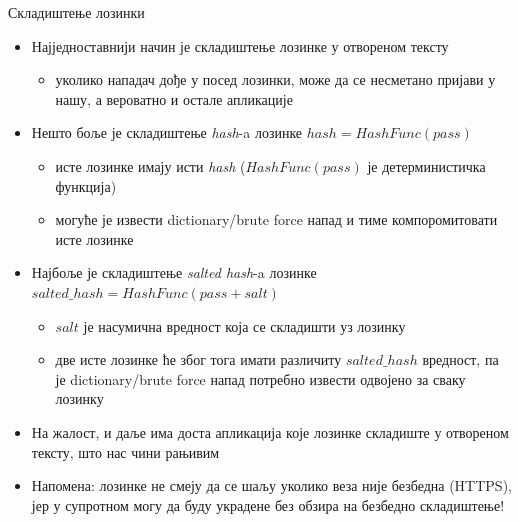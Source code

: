 \documentclass{beamer}
\begin{document}
    \begin{frame}[allowframebreaks]{Складиштење лозинки}
        \begin{itemize}
            \item Најједноставнији начин је складиштење лозинке у отвореном тексту
            \begin{itemize}
                \item уколико нападач дође у посед лозинки, може да се несметано пријави у нашу, а вероватно и остале апликације
            \end{itemize}
            \item Нешто боље је складиштење \textit{hash}-a лозинке \begin{math}hash = HashFunc(pass)\end{math}
            \begin{itemize}
                \item исте лозинке имају исти \textit{hash} (\begin{math}HashFunc(pass)\end{math} је детерминистичка функција)
                \item могуће је извести dictionary/brute force напад и тиме компоромитовати исте лозинке
            \end{itemize}
            
            \framebreak
            
            \item Најбоље је складиштење \textit{salted hash}-a лозинке \begin{math}salted\_hash = HashFunc(pass + salt)\end{math}
            \begin{itemize}
                \item \begin{math}salt\end{math} је насумична вредност која се складишти уз лозинку
                \item две исте лозинке ће због тога имати различиту \begin{math}salted\_hash\end{math} вредност, па је dictionary/brute force напад потребно извести одвојено за сваку лозинку
            \end{itemize}
            \item На жалост, и даље има доста апликација које лозинке складиште у отвореном тексту, што нас чини рањивим
            \item Напомена: лозинке не смеју да се шаљу уколико веза није безбедна (HTTPS), јер у супротном могу да буду украдене без обзира на безбедно складиштење!
            

\end{itemize}
\end{frame}
\end{document}
